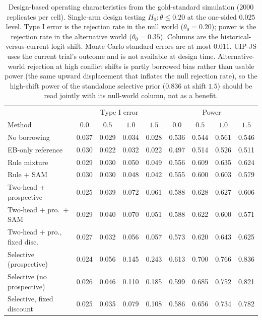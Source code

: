 \documentclass[11pt]{article}
\begin{document}
\begin{table}[htbp]
\centering
\small
\caption{Design-based operating characteristics from the gold-standard
simulation ($2000$ replicates per cell). Single-arm design testing
$H_0\!:\theta \le 0.20$ at the one-sided $0.025$ level. Type I error is the
rejection rate in the null world ($\theta_0 = 0.20$); power is the rejection
rate in the alternative world ($\theta_0 = 0.35$). Columns are the
historical-versus-current logit shift. Monte Carlo standard errors are at most
$0.011$. UIP-JS uses the current trial's outcome and is not available at design
time. Alternative-world rejection at high conflict shifts is partly borrowed
bias rather than usable power (the same upward displacement that inflates the
null rejection rate), so the high-shift power of the standalone selective
prior ($0.836$ at shift $1.5$) should be read jointly with its null-world
column, not as a benefit.}
\label{tab:design-oc}
\begin{tabular}{lcccccccc}
\hline
 & \multicolumn{4}{c}{Type I error} & \multicolumn{4}{c}{Power} \\
Method & $0.0$ & $0.5$ & $1.0$ & $1.5$ & $0.0$ & $0.5$ & $1.0$ & $1.5$ \\
\hline
No borrowing                    & 0.037 & 0.029 & 0.034 & 0.028 & 0.536 & 0.544 & 0.561 & 0.546 \\
EB-only reference               & 0.030 & 0.022 & 0.032 & 0.022 & 0.497 & 0.514 & 0.526 & 0.511 \\
Rule mixture                    & 0.029 & 0.030 & 0.050 & 0.049 & 0.556 & 0.609 & 0.635 & 0.624 \\
Rule + SAM                      & 0.030 & 0.030 & 0.048 & 0.042 & 0.555 & 0.600 & 0.603 & 0.579 \\
Two-head + prospective          & 0.025 & 0.039 & 0.072 & 0.061 & 0.588 & 0.628 & 0.627 & 0.606 \\
Two-head + pro.\ + SAM          & 0.029 & 0.040 & 0.070 & 0.051 & 0.588 & 0.622 & 0.600 & 0.571 \\
Two-head + pro., fixed disc.    & 0.027 & 0.032 & 0.056 & 0.057 & 0.573 & 0.620 & 0.643 & 0.625 \\
Selective (prospective)         & 0.024 & 0.056 & 0.145 & 0.243 & 0.613 & 0.700 & 0.766 & 0.836 \\
Selective (no prospective)      & 0.026 & 0.046 & 0.110 & 0.185 & 0.599 & 0.685 & 0.752 & 0.821 \\
Selective, fixed discount       & 0.025 & 0.035 & 0.079 & 0.108 & 0.586 & 0.656 & 0.734 & 0.782 \\

\end{tabular}
\end{table}
\end{document}
